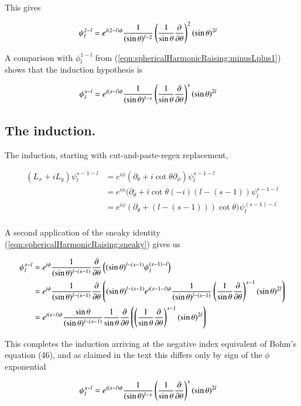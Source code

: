 This gives

\begin{align}\label{eqn:sphericalHarmonicRaising:2minusL}
\psi_l^{2-l} 
&=
e^{i(2-l)\phi} \frac{1}{(\sin\theta)^{l-2}} \left( \frac{1}{\sin\theta}\frac{\partial {}}{\partial {\theta}} \right)^2 (\sin\theta)^{2l} 
\end{align}

A comparison with $\phi_l^{1-l}$ from (\ref{eqn:sphericalHarmonicRaising:minusLplus1}) shows that the induction hypothesis is

\begin{align}
\psi_l^{s-l} 
&=
e^{i(s-l)\phi} \frac{1}{(\sin\theta)^{l-s}} \left( \frac{1}{\sin\theta}\frac{\partial {}}{\partial {\theta}} \right)^s (\sin\theta)^{2l} 
\end{align}

\subsection{The induction.}

The induction, starting with cut-and-paste-regex replacement, 

\begin{align*}
(L_x + iL_y) \psi_l^{{s-1}-l} 
&=
e^{i\phi} (\partial_\theta + i \cot\theta \partial_\phi) \psi_l^{{s-1}-l} \\
&=
e^{i\phi} (\partial_\theta + i \cot\theta (-i)(l -(s-1)) \psi_l^{{s-1}-l} \\
&=
e^{i\phi} (\partial_\theta + (l -(s-1)))\cot\theta ) \psi_l^{(s-1)-l} \\
\end{align*}

A second application of the sneaky identity (\ref{eqn:sphericalHarmonicRaising:sneaky}) gives us

\begin{align*}
\psi_l^{s-l} 
&=
e^{i\phi} \frac{1}{(\sin\theta)^{l-(s-1)}} \frac{\partial {}}{\partial {\theta}} \left( (\sin\theta)^{l-(s-1)} \psi_l^{(s-1)-l} \right) \\
&=
e^{i\phi} \frac{1}{(\sin\theta)^{l-(s-1)}} \frac{\partial {}}{\partial {\theta}} \left( (\sin\theta)^{l-(s-1)} 
e^{i(s-1-l)\phi} \frac{1}{(\sin\theta)^{l-(s-1)}} \left( \frac{1}{\sin\theta}\frac{\partial {}}{\partial {\theta}} \right)^{s-1} (\sin\theta)^{2l} 
\right) \\
&=
e^{i(s-l)\phi}
\frac{\sin\theta}{(\sin\theta)^{l-(s-1)}} \frac{1}{\sin\theta} \frac{\partial {}}{\partial {\theta}} \left( 
\left( \frac{1}{\sin\theta}\frac{\partial {}}{\partial {\theta}} \right)^{s-1} (\sin\theta)^{2l} 
\right) \\
\end{align*}

This completes the induction arriving at the negative index equivalent of Bohm's equation (46), and as claimed in the text this differs only by sign of the $\phi$ exponential

\begin{align}\label{eqn:sphericalHarmonicRaising:sminusL}
\psi_l^{s-l} 
&=
e^{i(s-l)\phi} \frac{1}{(\sin\theta)^{l-s}} \left( \frac{1}{\sin\theta}\frac{\partial {}}{\partial {\theta}} \right)^s (\sin\theta)^{2l} 
\end{align}

\EndArticle
